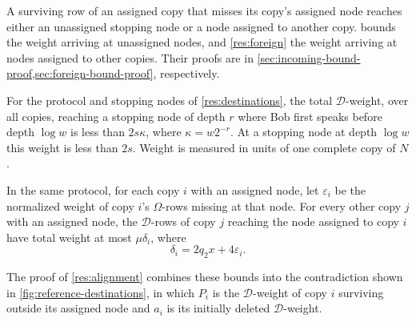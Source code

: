 \documentclass[11pt,letterpaper]{article} \usepackage[utf8]{inputenc}
\theoremstyle{plain} \newtheorem{theorem}{Theorem}[section]
\theoremstyle{definition} \newaliascnt{definition}{theorem}
\begin{document}
A surviving row of an assigned copy that misses its copy's assigned node
reaches either an unassigned stopping node or a node assigned to another copy.
 bounds the weight arriving at unassigned nodes, and
\cref{res:foreign} the weight arriving at nodes assigned to other copies.
Their proofs are in
\cref{sec:incoming-bound-proof,sec:foreign-bound-proof}, respectively.

\begin{lemma}\label{res:incoming}
For the protocol and stopping nodes of \cref{res:destinations}, the total
$\mathcal D$-weight, over all copies, reaching a stopping node of depth $r$ where Bob first
speaks before depth $\log w$ is less than $2s\kappa$, where $\kappa=w2^{-r}$.
At a stopping node at depth $\log w$ this weight is less than $2s$.
Weight is measured in units of one complete copy of $N$.
\end{lemma}

\begin{lemma}\label{res:foreign}
In the same protocol, for each copy $i$ with an assigned node, let
$\varepsilon_i$ be the normalized weight of copy $i$'s $\Omega$-rows missing
at that node. For every
other copy $j$ with an assigned node, the $\mathcal D$-rows of copy $j$ reaching
the node assigned to copy $i$ have total weight at most $\mu\delta_i$, where
\[
 \delta_i=2q_2x+4\varepsilon_i.
\]
\end{lemma}

The proof of \cref{res:alignment} combines these bounds into the contradiction shown in
\cref{fig:reference-destinations}, in which $P_i$ is the $\mathcal D$-weight of
copy $i$ surviving outside its assigned node and $a_i$ is its initially
deleted $\mathcal D$-weight.
\end{document}
